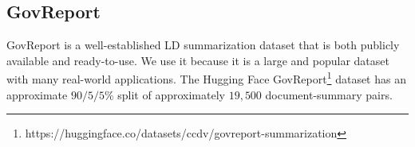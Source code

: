 \subsection*{GovReport}
GovReport is a well-established LD summarization dataset that is both publicly available and ready-to-use. We use it because it is a large and popular dataset with many real-world applications. The Hugging Face GovReport\footnote{https://huggingface.co/datasets/ccdv/govreport-summarization} dataset has an approximate $90/5/5\%$ split of approximately $19,500$ document-summary pairs.